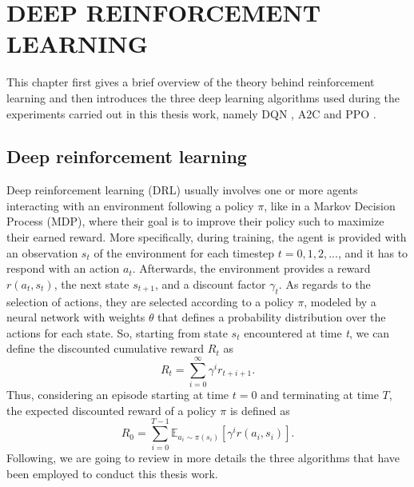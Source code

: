 
\chapter{DEEP REINFORCEMENT LEARNING}
\label{sec:drl}

This chapter first gives a brief overview of the theory behind reinforcement learning and then introduces the three deep learning algorithms used during the experiments carried out in this thesis work, namely DQN \cite{mnih2013playing}, A2C \cite{mnih2016asynchronous} and PPO \cite{schulman2017proximal}.

\section{Deep reinforcement learning}
Deep reinforcement learning (DRL) usually involves one or more agents interacting with an environment following a policy \(\pi\), like in a Markov Decision Process (MDP), where their goal is to improve their policy such to maximize their earned reward. More specifically, during training, the agent is provided with an observation \(s_t\) of the environment for each timestep \(t=0,1,2,...\), and it has to respond with an action \(a_{t}\). Afterwards, the environment provides a reward \(r(a_t,s_t)\), the next state \(s_{t+1}\), and a discount factor \(\gamma_t\). As regards to the selection of actions, they are selected according to a policy \(\pi\), modeled by a neural network with weights \(\theta\) that defines a probability distribution over the actions for each state. So, starting from state \(s_t\) encountered at time \textit{t}, we can define the discounted cumulative reward \(R_t\) as
\begin{equation}
R_t=\sum_{i=0}^{\infty}\gamma^{i}r_{t+i+1}.
\end{equation}
Thus, considering an episode starting at time \(t=0\) and terminating at time \(T\), the expected discounted reward of a policy \(\pi\) is defined as
\begin{equation}
R_0=\sum_{i=0}^{T-1}\mathbb{E}_{a_i\sim \pi(s_i)}[\gamma^i r(a_i,s_i)].
\end{equation}
Following, we are going to review in more details the three algorithms that have been employed to conduct this thesis work.


